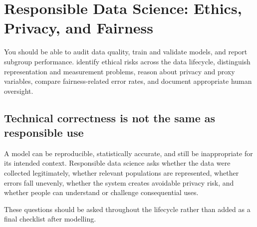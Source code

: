 \chapter{Responsible Data Science: Ethics, Privacy, and Fairness}
\label{chap:responsible}
\chapterguide
  {You should be able to audit data quality, train and validate models, and report subgroup performance.}
  {identify ethical risks across the data lifecycle, distinguish representation and measurement problems, reason about privacy and proxy variables, compare fairness-related error rates, and document appropriate human oversight.}

\section{Technical correctness is not the same as responsible use}
A model can be reproducible, statistically accurate, and still be inappropriate for its intended context. Responsible data science asks whether the data were collected legitimately, whether relevant populations are represented, whether errors fall unevenly, whether the system creates avoidable privacy risk, and whether people can understand or challenge consequential uses.

These questions should be asked throughout the lifecycle rather than added as a final checklist after modelling.

